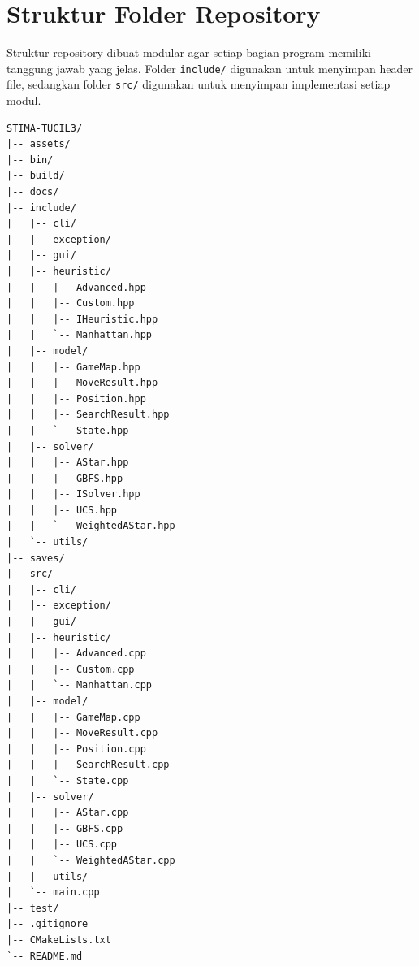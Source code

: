 \section{Struktur Folder Repository}

Struktur repository dibuat modular agar setiap bagian program memiliki tanggung jawab yang jelas. 
Folder \texttt{include/} digunakan untuk menyimpan header file, sedangkan folder \texttt{src/} digunakan untuk menyimpan implementasi setiap modul.

\begin{tcolorbox}[
	colback=gray!5,
	colframe=black!60,
	title=\textbf{Struktur Folder Utama},
	arc=2mm,
	boxrule=0.8pt
]
\scriptsize
\begin{verbatim}
STIMA-TUCIL3/
|-- assets/
|-- bin/
|-- build/
|-- docs/
|-- include/
|   |-- cli/
|   |-- exception/
|   |-- gui/
|   |-- heuristic/
|   |   |-- Advanced.hpp
|   |   |-- Custom.hpp
|   |   |-- IHeuristic.hpp
|   |   `-- Manhattan.hpp
|   |-- model/
|   |   |-- GameMap.hpp
|   |   |-- MoveResult.hpp
|   |   |-- Position.hpp
|   |   |-- SearchResult.hpp
|   |   `-- State.hpp
|   |-- solver/
|   |   |-- AStar.hpp
|   |   |-- GBFS.hpp
|   |   |-- ISolver.hpp
|   |   |-- UCS.hpp
|   |   `-- WeightedAStar.hpp
|   `-- utils/
|-- saves/
|-- src/
|   |-- cli/
|   |-- exception/
|   |-- gui/
|   |-- heuristic/
|   |   |-- Advanced.cpp
|   |   |-- Custom.cpp
|   |   `-- Manhattan.cpp
|   |-- model/
|   |   |-- GameMap.cpp
|   |   |-- MoveResult.cpp
|   |   |-- Position.cpp
|   |   |-- SearchResult.cpp
|   |   `-- State.cpp
|   |-- solver/
|   |   |-- AStar.cpp
|   |   |-- GBFS.cpp
|   |   |-- UCS.cpp
|   |   `-- WeightedAStar.cpp
|   |-- utils/
|   `-- main.cpp
|-- test/
|-- .gitignore
|-- CMakeLists.txt
`-- README.md
\end{verbatim}
\end{tcolorbox}

